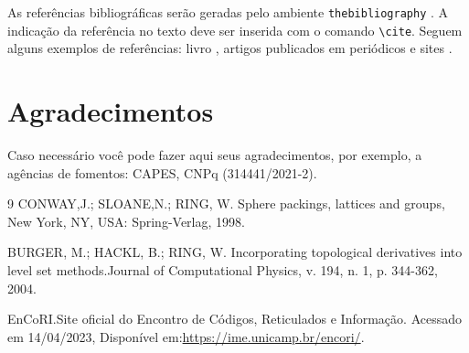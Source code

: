 \documentclass{semat}
\begin{document}
As referências bibliográficas serão geradas pelo ambiente \verb+thebibliography+ . A indicação da referência no texto deve ser inserida com o comando \verb+\cite+. Seguem alguns exemplos de referências: livro \cite{conway2013sphere}, artigos publicados em periódicos \cite{burger2004derivatives} e sites \cite{EnCoRI}. 

\vspace{1.5em}


\section*{Agradecimentos} %
Caso necessário você pode fazer aqui seus agradecimentos, por exemplo, a agências de fomentos: CAPES, CNPq (314441/2021-2).



\begin{thebibliography}{9}
CONWAY,J.; SLOANE,N.; RING, W. 
Sphere packings, lattices and groups,
  New York, NY, USA: Spring-Verlag, 1998.

BURGER, M.; HACKL, B.; RING, W. Incorporating topological derivatives into level set methods.Journal of Computational Physics, v. 194, n. 1, p. 344-362, 2004.

  EnCoRI.Site oficial do Encontro de Códigos, Reticulados e Informação. Acessado em 14/04/2023, Disponível em:\url{https://ime.unicamp.br/encori/}.
\end{thebibliography}
\end{document}

